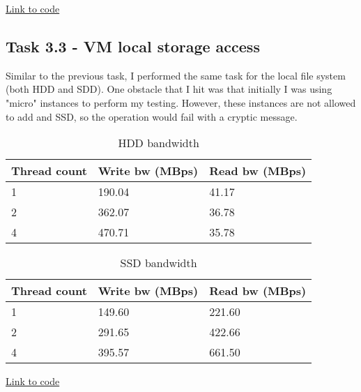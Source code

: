 \documentclass[paper=a4, fontsize=11pt]{scrartcl}
\numberwithin{equation}{section}    %
\numberwithin{figure}{section}      %
\numberwithin{table}{section}       %
\begin{document}
\href{https://github.com/valenting/id2210-cloud-project-2018/blob/master/test_internal_storage.py}{Link to code}

\subsection{Task 3.3 - VM local storage access}

Similar to the previous task, I performed the same task for the local file system (both HDD and SDD).
One obstacle that I hit was that initially I was using "micro" instances to perform my testing. However, these instances are not allowed to add and SSD, so the operation would fail with a cryptic message.


\begin{table}[htb]
\centering
\caption{HDD bandwidth}
\begin{tabular}{|l|l|l|}
\hline
Thread count & Write bw (MBps) & Read bw (MBps) \\ \hline
1            & 190.04          & 41.17          \\ \hline
2            & 362.07          & 36.78          \\ \hline
4            & 470.71          & 35.78          \\ \hline
\end{tabular}
\end{table}

\begin{table}[htb]
\centering
\caption{SSD bandwidth}
\begin{tabular}{|l|l|l|}
\hline
Thread count & Write bw (MBps) & Read bw (MBps) \\ \hline
1            & 149.60          & 221.60          \\ \hline
2            & 291.65          & 422.66          \\ \hline
4            & 395.57          & 661.50          \\ \hline
\end{tabular}
\end{table}

\href{https://github.com/valenting/id2210-cloud-project-2018/blob/master/test_internal_storage.py#L63-L73}{Link to code}
\end{document}
